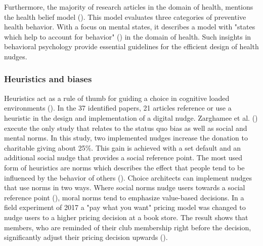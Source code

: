 Furthermore, the majority of research articles in the domain of health, mentions the health belief model (\cite{rosenstock_health_1974}). This model evaluates three categories of preventive health behavior. With a focus on mental states, it describes a model with "states which help to account for behavior" (\cite[p.354]{rosenstock_health_1974}) in the domain of health. Such insights in behavioral psychology provide essential guidelines for the efficient design of health nudges.


\subsubsection{Heuristics and biases}

Heuristics act as a rule of thumb for guiding a choice in cognitive loaded environments (\cite{thaler_nudge:_2009}). In the 37 identified papers, 21 articles reference or use a heuristic in the design and implementation of a digital nudge. Zarghamee et al. (\citeyear{zarghamee_nudging_2017}) execute the only study that relates to the status quo bias as well as social and mental norms. In this study, two implemented nudges increase the donation to charitable giving about 25\%. This gain is achieved with a set default and an additional social nudge that provides a social reference point.
The most used form of heuristics are norms which describes the effect that people tend to be influenced by the behavior of others (\cite{schneider_digital_2018}). Choice architects can implement nudges that use norms in two ways. Where social norms nudge users towards a social reference point (\cite{wang_socially_2018}), moral norms tend to emphasize value-based decisions. In a field experiment of 2017 a "pay what you want" pricing model was changed to nudge users to a higher pricing decision at a book store. The result shows that members, who are reminded of their club membership right before the decision, significantly adjust their pricing decision upwards (\cite{gravert_pride_2017}).

